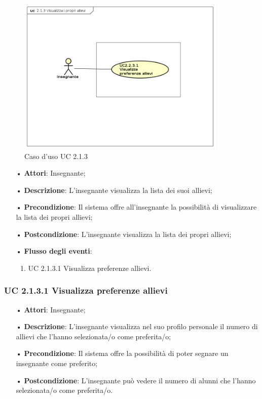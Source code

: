 \begin{figure}[H]
\centering
\includegraphics[width=10cm]{img/UC213.png} 
\caption{Caso d'uso UC 2.1.3}
\end{figure}

\begin{itemize}
	\item[•] \textbf{Attori}: Insegnante;
	\item[•] \textbf{Descrizione}: L’insegnante visualizza la lista dei suoi allievi;
	\item[•] \textbf{Precondizione}: Il sistema offre all’insegnante la possibilità di visualizzare la lista dei propri allievi;
	\item[•] \textbf{Postcondizione}: L’insegnante visualizza la lista dei propri allievi;
	\item[•] \textbf{Flusso degli eventi}:
		\begin{enumerate}
			\item UC 2.1.3.1 Visualizza preferenze allievi.
		\end{enumerate}
\end{itemize}

\subsubsection{UC 2.1.3.1 Visualizza preferenze allievi}
\begin{itemize}
	\item[•] \textbf{Attori}: Insegnante;
	\item[•] \textbf{Descrizione}: L’insegnante visualizza nel suo profilo personale il numero di allievi che l'hanno selezionata/o come preferita/o;
	\item[•] \textbf{Precondizione}: Il sistema offre la possibilità di poter segnare un insegnante come preferito;
	\item[•] \textbf{Postcondizione}: L’insegnante può vedere il numero di alunni che l'hanno selezionata/o come preferita/o.
\end{itemize}


